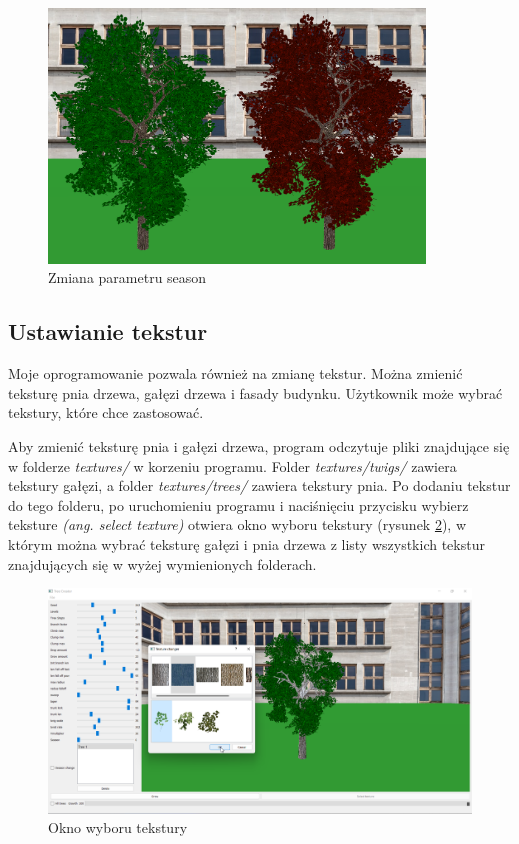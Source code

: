 \documentclass[a4paper,twoside,12pt]{report}
\begin{document}
\begin{figure}[H]
	\centering\includegraphics[width=10cm]{grafika/params/Season.png}
	\caption{Zmiana parametru season}
    \label{fig:season}
\end{figure}

\subsection{Ustawianie tekstur}

Moje oprogramowanie pozwala również na zmianę tekstur. 
Można zmienić teksturę pnia drzewa, gałęzi drzewa i fasady budynku.
Użytkownik może wybrać tekstury, które chce zastosować. 

Aby zmienić teksturę pnia i gałęzi drzewa, program odczytuje pliki 
znajdujące się w folderze \textit{textures/} w korzeniu programu. 
Folder \textit{textures/twigs/} zawiera tekstury gałęzi, 
a folder \textit{textures/trees/} zawiera tekstury pnia.
Po dodaniu tekstur do tego folderu, po uruchomieniu programu i 
naciśnięciu przycisku wybierz teksture \textit{(ang. select texture)} 
otwiera okno wyboru tekstury (rysunek \ref{fig:texchoosewin}), w którym 
można wybrać teksturę gałęzi i pnia drzewa z listy wszystkich tekstur 
znajdujących się w wyżej wymienionych folderach.

\begin{figure}[ht]
	\centering\includegraphics[width=12cm]{grafika/program/texture2.png}
	\caption{Okno wyboru tekstury}
    \label{fig:texchoosewin}
\end{figure}
\end{document}

